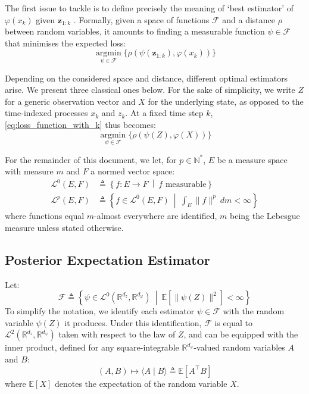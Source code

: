 The first issue to tackle is to define precisely the meaning of `best estimator' of $\varphi(x_k)$ given $\mathbf{z}_{1:k}$ \cite{bib:Bayesian-estimators}. Formally, given a space of functions $\mathcal{F}$ and a distance $\rho$ between random variables, it amounts to finding a measurable function $\psi\in\mathcal{F}$ that minimises the expected loss:
\begin{equation}
	\underset{\psi\in\mathcal{F}}{\operatorname{argmin}}\{\rho(\psi(\mathbf{z}_{1:k}),\varphi(x_k))\}\label{eq:loss_function_with_k}
\end{equation}

Depending on the considered space and distance, different optimal estimators arise. We present three classical ones below. For the sake of simplicity, we write $Z$ for a generic observation vector and $X$ for the underlying state, as opposed to the time-indexed processes $x_k$ and $z_k$. At a fixed time step $k$, \eqref{eq:loss_function_with_k} thus becomes:
\begin{equation}
	\underset{\psi\in\mathcal{F}}{\operatorname{argmin}}\{\rho(\psi(Z),\varphi(X))\}\label{eq:loss_function}
\end{equation}

For the remainder of this document, we let, for $p\in\mathbb{N}^*$, $E$ be a measure space with measure $m$ and $F$ a normed vector space:
\begin{equation}
	\begin{aligned}
	\mathcal{L}^0\left(E,F\right)&\triangleq\left\{f:E\to F\:\middle|\:f\text{ measurable}\right\}\\
	\mathcal{L}^p\left(E,F\right)&\triangleq\left\{f\in\mathcal{L}^0\left(E,F\right)\:\middle|\:\int_E{\|f\|^p\:dm}<\infty\right\}
	\end{aligned}
\end{equation}
where functions equal $m$-almost everywhere are identified, $m$ being the Lebesgue measure unless stated otherwise.

\subsection{Posterior Expectation Estimator}

Let:
\begin{equation}
	\mathcal{F}\triangleq\left\{\psi\in\mathcal{L}^0\left(\mathbb{R}^{d_z},\mathbb{R}^{d_{\varphi}}\right)\:\middle|\:\mathbb{E}\left[\|\psi(Z)\|^2\right]<\infty\right\}
\end{equation}
To simplify the notation, we identify each estimator $\psi\in\mathcal{F}$ with the random variable $\psi(Z)$ it produces. Under this identification, $\mathcal{F}$ is equal to $\mathcal{L}^2\left(\mathbb{R}^{d_z},\mathbb{R}^{d_{\varphi}}\right)$ taken with respect to the law of $Z$, and can be equipped with the inner product, defined for any square-integrable $\mathbb{R}^{d_{\varphi}}$-valued random variables $A$ and $B$:
\begin{equation}
	(A,B)\mapsto\langle A\mid B\rangle\triangleq\mathbb{E}\left[A^\top B\right]
\end{equation}
where $\mathbb{E}[X]$ denotes the expectation of the random variable $X$.

